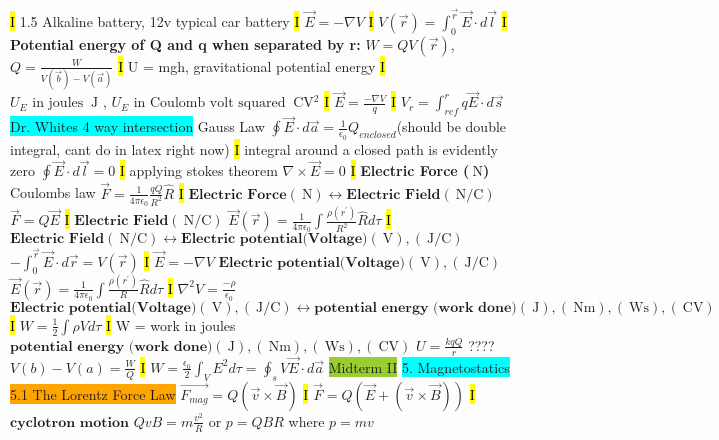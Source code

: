 \documentclass[fontsize=4pt]{scrartcl}
\begin{document}
\hl{I}
1.5 Alkaline battery, 12v typical car battery
\hl{I}
$\vec{E} = -\nabla V$
\hl{I}
$V(\vec{r}) = \int_{0}^{\vec{r}} \vec{E} \cdot d\vec{l}$
\hl{I}
\textbf{Potential energy of Q and q when separated by r:}
$W = QV(\vec{r})$,
$Q = \frac{W}{V(\vec{b})-V(\vec{a})}$
\hl{I}
U = mgh, gravitational potential energy
\hl{I}
$U_E \text{ in joules }\SI{}{\joule}\text{ , }U_E \text{ in Coulomb volt squared } \SI{}{\coulomb \volt^2}$
\hl{I}
$\vec{E} = \frac{-\nabla V}{q}$
\hl{I}
$V_r = \int_{ref}^{r} q\vec{E}\cdot d\vec{s}$ 
\colorbox{Cyan}{Dr. Whites 4 way intersection}
Gauss Law $\oint \vec{E} \cdot d\vec{a} = \frac{1}{\epsilon_0}Q_{enclosed}$(should be double integral, cant do in latex right now)
\hl{I}
integral around a closed path is evidently zero $\oint \vec{E} \cdot d\vec{l} = 0 $
\hl{I}
applying stokes theorem $\nabla \times \vec{E} =0$
\hl{I}
\textbf{Electric Force ($\SI{}{\newton}$) }
Coulombs law $\vec{F} = \frac{1}{4\pi \epsilon_0} \frac{qQ}{R^2} \hat{R}$
\hl{I}
$\textbf{Electric Force} (\SI{}{\newton}) \leftrightarrow \textbf{Electric Field} (\SI{}{\newton / \coulomb}) $ 
$\vec{F} = Q\vec{E}$
\hl{I}
$\textbf{Electric Field} (\SI{}{\newton / \coulomb}) $ 
$\vec{E}(\vec{r})=\frac{1}{4\pi \epsilon_0}\int \frac{\rho (r^{\prime})}{R^2}\hat{R}d\tau$
\hl{I}
$\textbf{Electric Field} (\SI{}{\newton / \coulomb}) \leftrightarrow \textbf{Electric potential(Voltage)} (\SI{}{\volt}), (\SI{}{\joule / \coulomb})  $ 
$-\int_{0}^{\vec{r}} \vec{E} \cdot d\vec{r} = V(\vec{r})$
\hl{I}
$\vec{E} = -\nabla V$
$\textbf{Electric potential(Voltage)} (\SI{}{\volt}), (\SI{}{\joule / \coulomb})  $ 
$\vec{E}(\vec{r})=\frac{1}{4\pi \epsilon_0}\int \frac{\rho (r^{\prime})}{R}\hat{R}d\tau$
\hl{I}
$\nabla^2 V = \frac{-\rho}{\epsilon_0}$
$\textbf{Electric potential(Voltage)} (\SI{}{\volt}), (\SI{}{\joule / \coulomb})  \leftrightarrow \textbf{potential energy (work done)} (\SI{}{\joule}), (\SI{}{\newton \meter}), (\SI{}{\watt \second}), (\SI{}{\coulomb \volt}) $ 
\hl{I}
$W = \frac{1}{2}\int \rho V d\tau$
\hl{I}
W = work in joules 
$\textbf{potential energy (work done)} (\SI{}{\joule}), (\SI{}{\newton \meter}), (\SI{}{\watt \second}), (\SI{}{\coulomb \volt}) $ 
$U = \frac{kqQ}{r}$ ????
$V(b) - V(a) = \frac{W}{Q}$
\hl{I}
$W = \frac{\epsilon_0}{2}\int_V E^2 d\tau = \oint_s V\vec{E} \cdot d\vec{a}$ 
\colorbox{YellowGreen}{Midterm II}
\colorbox{Cyan}{5. Magnetostatics}
\colorbox{Orange}{5.1 The Lorentz Force Law}
$\vec{F_{mag}} = Q(\vec{v}\times \vec{B})$
\hl{I}
$\vec{F} = Q(\vec{E} + (\vec{v}\times \vec{B}))$
\hl{I}
$\textbf{cyclotron motion}$
$QvB = m\frac{v^2}{R}$ or $p = QBR$ where $p=mv$
\end{document}
